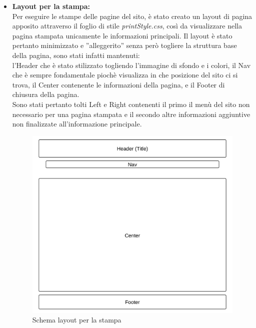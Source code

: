 \begin{itemize}



\item \textbf{Layout per la stampa:}\\
Per eseguire le stampe delle pagine del sito, è stato creato un layout di pagina apposito attraverso il foglio di stile \textit{printStyle.css}, così da visualizzare nella pagina stampata unicamente le informazioni principali. Il layout è stato pertanto minimizzato e ''alleggerito'' senza però togliere la struttura base della pagina, sono stati infatti mantenuti:\\
l'Header che è stato stilizzato togliendo l'immagine di sfondo e i colori, il Nav che è sempre fondamentale piochè visualizza in che posizione del sito ci si trova, il Center contenente le informazioni della pagina, e il Footer di chiusura della pagina.\\
Sono stati pertanto tolti Left e Right contenenti il primo il menù del sito non necessario per una pagina stampata e il secondo altre informazioni aggiuntive non finalizzate all'informazione principale.


 

\begin{center}
\begin{figure}[H]
\centering
\includegraphics[scale=0.55]{images/printLayout.png}
\caption{Schema layout per la stampa}
\end{figure}
\end{center}




\end{itemize}
